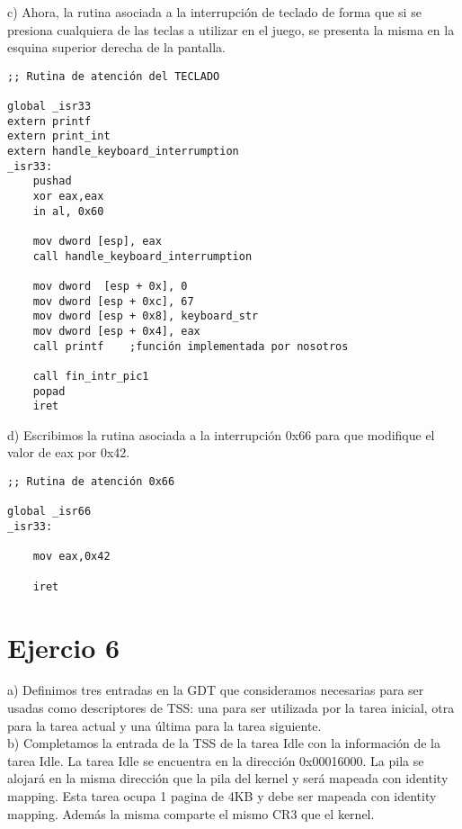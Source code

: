 \documentclass[a4paper]{article}
\begin{document}
{\large c)} Ahora, la rutina asociada a la interrupci\'on de teclado de forma que si se presiona cualquiera
de las teclas a utilizar en el juego, se presenta la misma en la esquina superior derecha de la pantalla. \\

\begin{codesnippet}
\begin{verbatim}
;; Rutina de atención del TECLADO

global _isr33
extern printf
extern print_int
extern handle_keyboard_interrumption
_isr33:
    pushad
    xor eax,eax
    in al, 0x60

    mov dword [esp], eax
    call handle_keyboard_interrumption
    
    mov dword  [esp + 0x], 0
    mov dword [esp + 0xc], 67
    mov dword [esp + 0x8], keyboard_str
    mov dword [esp + 0x4], eax
    call printf    ;función implementada por nosotros

    call fin_intr_pic1
    popad
    iret
\end{verbatim}
\end{codesnippet}


{\large d)} Escribimos la rutina asociada a la interrupci\'on 0x66 para que modifique el valor de eax por
0x42. 
\begin{codesnippet}
\begin{verbatim}
;; Rutina de atención 0x66

global _isr66
_isr33:

    mov eax,0x42
  
    iret
\end{verbatim}
\end{codesnippet}

\newpage
\section{Ejercio 6}
{\large a)} Definimos tres entradas en la GDT que consideramos necesarias para ser usadas como descriptores
de TSS: una para ser utilizada por la tarea inicial, otra para la tarea actual y una \'ultima para la tarea siguiente.\\

{\large b)} Completamos la entrada de la TSS de la tarea Idle con la informaci\'on de la tarea Idle. La tarea Idle se encuentra en la direcci\'on 0x00016000. La pila se alojar\'a en la misma direcci\'on que la pila del kernel y ser\'a mapeada
con identity mapping. Esta tarea ocupa 1 pagina de 4KB y debe ser mapeada con identity mapping. Adem\'as la misma comparte el mismo CR3 que el kernel. \\
\end{document}
